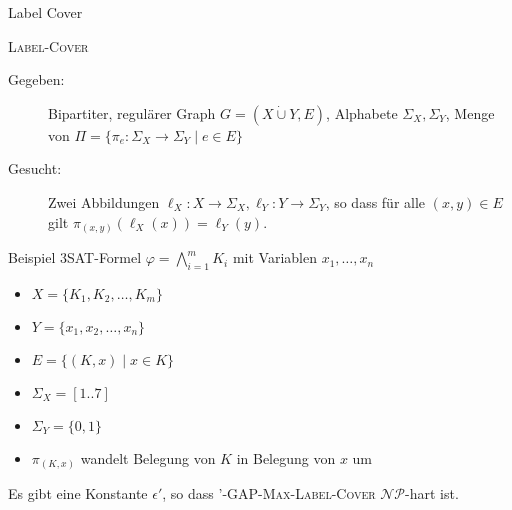 \documentclass[table,german,10pt]{beamer}
\begin{document}
\begin{frame}{Label Cover}
  \begin{block}{\textsc{Label-Cover}}
    \begin{description}
    \item[Gegeben:] Bipartiter, regulärer Graph $G=(X\dot{\cup} Y, E)$,
      Alphabete $\Sigma_{X},\Sigma_{Y}$, Menge von $\Pi=\{\pi_{e}\colon
      \Sigma_{X}\to \Sigma_{Y} \mid e\in E\}$
    \item[Gesucht:] Zwei Abbildungen $\ell_{X}\colon X\to \Sigma_{X},
      \ell_{Y}\colon Y\to \Sigma_{Y}$, so dass für
      alle $(x,y)\in E$ gilt $\pi_{(x,y)}(\ell_{X}(x))=\ell_{Y}(y)$. 
    \end{description}
    
  \end{block}
  \pause
  \begin{block}{Beispiel}
    3SAT-Formel $\varphi=\bigwedge_{i=1}^{m}K_{i}$ mit Variablen $x_{1},\ldots,x_{n}$

    \begin{itemize}[<+->]
    \item $X=\{K_{1},K_{2},\ldots,K_{m}\}$
    \item $Y=\{x_{1},x_{2},\ldots,x_{n}\}$
    \item $E=\{(K,x)\mid x\in K\}$
    \item $\Sigma_{X}=[1..7]$
    \item $\Sigma_{Y}=\{0,1\}$
    \item $\pi_{(K,x)}$ wandelt Belegung von $K$ in Belegung von $x$ um 
    \end{itemize}
  \end{block}
\pause
\begin{theorem}
  Es gibt eine Konstante $\epsilon'$, so dass
  \textsc{\epsilon'-GAP-Max-Label-Cover} $\mathcal{NP}$-hart ist.
\end{theorem}
  
\end{frame}
\end{document}

